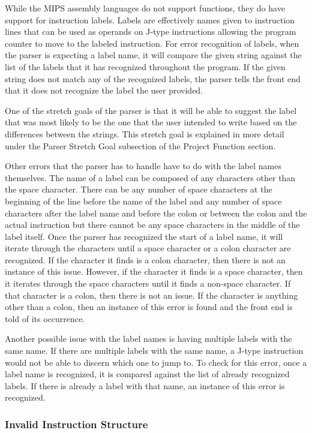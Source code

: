\documentclass[parskip=half, fontsize=12pt]{scrartcl}
\begin{document}
While the MIPS assembly languages do not support functions, they do have
support for instruction labels. Labels are effectively names given to
instruction lines that can be used as operands on J-type instructions
allowing the program counter to move to the labeled instruction. For
error recognition of labels, when the parser is expecting a label name,
it will compare the given string against the list of the labels that it
has recognized throughout the program. If the given string does not
match any of the recognized labels, the parser tells the front end that
it does not recognize the label the user provided.

One of the stretch goals of the parser is that it will be able to
suggest the label that was most likely to be the one that the user
intended to write based on the differences between the strings. This
stretch goal is explained in more detail under the Parser Stretch Goal
subsection of the Project Function section.

Other errors that the parser has to handle have to do with the label
names themselves. The name of a label can be composed of any characters
other than the space character. There can be any number of space
characters at the beginning of the line before the name of the label and
any number of space characters after the label name and before the colon
or between the colon and the actual instruction but there cannot be any
space characters in the middle of the label itself. Once the parser has
recognized the start of a label name, it will iterate through the
characters until a space character or a colon character are recognized.
If the character it finds is a colon character, then there is not an
instance of this issue. However, if the character it finds is a space
character, then it iterates through the space characters until it finds
a non-space character. If that character is a colon, then there is not
an issue. If the character is anything other than a colon, then an
instance of this error is found and the front end is told of its
occurrence.

Another possible issue with the label names is having multiple labels
with the same name. If there are multiple labels with the same name, a
J-type instruction would not be able to discern which one to jump to. To
check for this error, once a label name is recognized, it is compared
against the list of already recognized labels. If there is already a
label with that name, an instance of this error is recognized.

\subsubsection{Invalid Instruction Structure}
\end{document}
